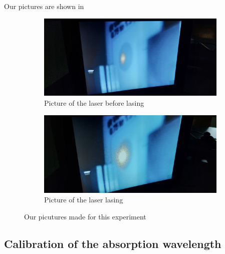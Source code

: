 Our pictures are shown in 
\begin{figure}
    \centering
    \begin{subfigure}[t]{0.3\textwidth}
        \centering
        \includegraphics[width=\textwidth]{images/photo_not_lasing.jpg}
        \caption{Picture of the laser before lasing}
        \label{fig:notlase}
    \end{subfigure}
    \begin{subfigure}[t]{0.3\textwidth}
        \centering
        \includegraphics[width=\textwidth]{images/photo_lasing.jpg}
        \caption{Picture of the laser lasing}
        \label{fig:lase}
    \end{subfigure}
    \caption{Our picutures made for this experiment}
    \label{fig:lasing}
\end{figure}

\subsection{Calibration of the absorption wavelength}
\label{ssec:exe2}


